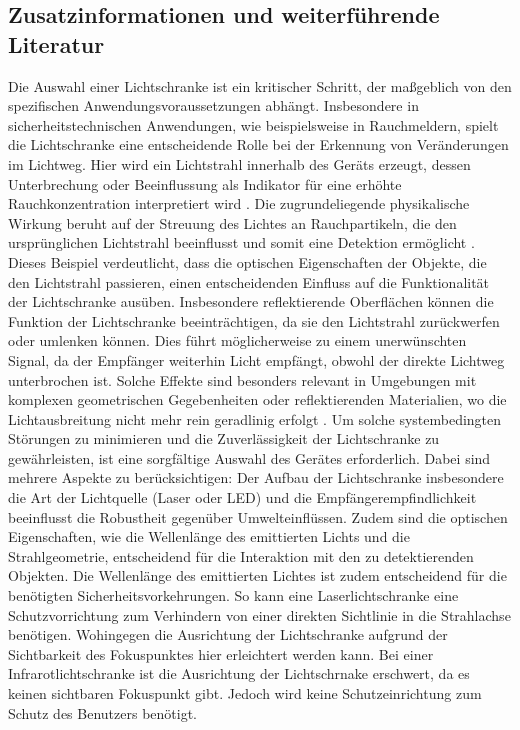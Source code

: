 %
\subsection{Zusatzinformationen und weiterführende Literatur }
Die Auswahl einer Lichtschranke ist ein kritischer Schritt, der maßgeblich von den spezifischen Anwendungsvoraussetzungen abhängt. Insbesondere in sicherheitstechnischen Anwendungen, wie beispielsweise in Rauchmeldern, spielt die Lichtschranke eine entscheidende Rolle bei der Erkennung von Veränderungen im Lichtweg. Hier wird ein Lichtstrahl innerhalb des Geräts erzeugt, dessen Unterbrechung oder Beeinflussung als Indikator für eine erhöhte Rauchkonzentration interpretiert wird \cite{Hesse:2009}. Die zugrundeliegende physikalische Wirkung beruht auf der Streuung des Lichtes an Rauchpartikeln, die den ursprünglichen Lichtstrahl beeinflusst und somit eine Detektion ermöglicht \cite{Hesse:2009}. Dieses Beispiel verdeutlicht, dass die optischen Eigenschaften der Objekte, die den Lichtstrahl passieren, einen entscheidenden Einfluss auf die Funktionalität der Lichtschranke ausüben.
Insbesondere reflektierende Oberflächen können die Funktion der Lichtschranke beeinträchtigen, da sie den Lichtstrahl zurückwerfen oder umlenken können. Dies führt möglicherweise zu einem unerwünschten Signal, da der Empfänger weiterhin Licht empfängt, obwohl der direkte Lichtweg unterbrochen ist. Solche Effekte sind besonders relevant in Umgebungen mit komplexen geometrischen Gegebenheiten oder reflektierenden Materialien, wo die Lichtausbreitung nicht mehr rein geradlinig erfolgt .
Um solche systembedingten Störungen zu minimieren und die Zuverlässigkeit der Lichtschranke zu gewährleisten, ist eine sorgfältige Auswahl des Gerätes erforderlich. Dabei sind mehrere Aspekte zu berücksichtigen: Der Aufbau der Lichtschranke insbesondere die Art der Lichtquelle (Laser oder LED) und die Empfängerempfindlichkeit beeinflusst die Robustheit gegenüber Umwelteinflüssen. Zudem sind die optischen Eigenschaften, wie die Wellenlänge des emittierten Lichts und die Strahlgeometrie, entscheidend für die Interaktion mit den zu detektierenden Objekten. Die Wellenlänge des emittierten Lichtes ist zudem entscheidend für die benötigten Sicherheitsvorkehrungen. So kann eine Laserlichtschranke eine Schutzvorrichtung zum Verhindern von einer direkten Sichtlinie in die Strahlachse benötigen. Wohingegen die Ausrichtung der Lichtschranke aufgrund der Sichtbarkeit des Fokuspunktes hier erleichtert werden kann. Bei einer Infrarotlichtschranke ist die Ausrichtung der Lichtschrnake erschwert, da es keinen sichtbaren Fokuspunkt gibt. Jedoch wird keine Schutzeinrichtung zum Schutz des Benutzers benötigt. 
